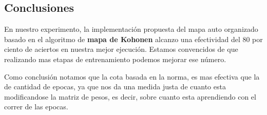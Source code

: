 \subsection{Conclusiones}

En nuestro experimento, la implementación propuesta del mapa auto organizado basado en el algoritmo
de \textbf{mapa de Kohonen} alcanzo una efectividad del 80 por ciento de aciertos en nuestra mejor
ejecución.
Estamos convencidos de que realizando mas etapas de entrenamiento podemos mejorar ese número.

Como conclusión notamos que la cota basada en la norma, es mas efectiva que la de cantidad de epocas,
ya que nos da una medida justa de cuanto esta modificandose la matriz de pesos, es decir, sobre cuanto
esta aprendiendo con el correr de las epocas.













